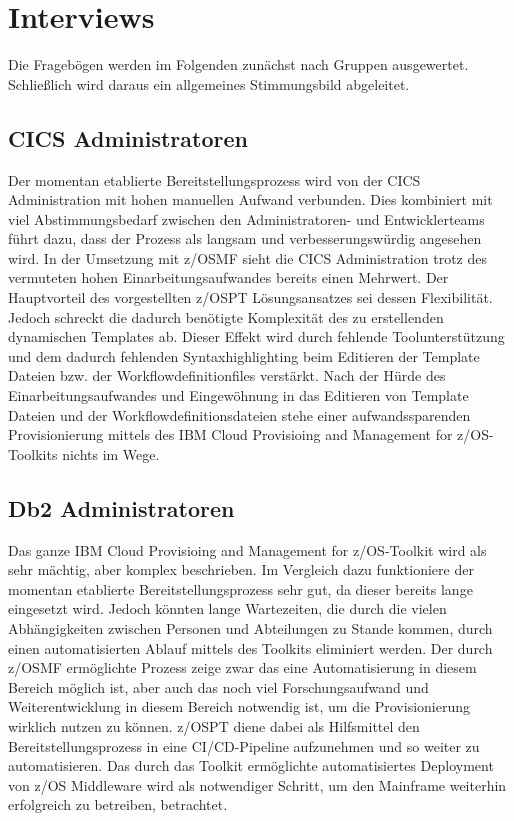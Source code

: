 \section{Interviews}
Die Fragebögen werden im Folgenden zunächst nach Gruppen ausgewertet.
Schließlich wird daraus ein allgemeines Stimmungsbild abgeleitet.

\subsection{CICS Administratoren}
Der momentan etablierte Bereitstellungsprozess wird von der CICS Administration mit hohen manuellen Aufwand verbunden.
Dies kombiniert mit viel Abstimmungsbedarf zwischen den Administratoren- und Entwicklerteams führt dazu, dass der Prozess als langsam und verbesserungswürdig angesehen wird.
In der Umsetzung mit z/OSMF sieht die CICS Administration trotz des vermuteten hohen Einarbeitungsaufwandes bereits einen Mehrwert.
Der Hauptvorteil des vorgestellten z/OSPT Lösungsansatzes sei dessen Flexibilität.
Jedoch schreckt die dadurch benötigte Komplexität des zu erstellenden dynamischen Templates ab.
Dieser Effekt wird durch fehlende Toolunterstützung und dem dadurch fehlenden Syntaxhighlighting beim Editieren der Template Dateien bzw. der Workflowdefinitionfiles verstärkt.
Nach der Hürde des Einarbeitungsaufwandes und Eingewöhnung in das Editieren von Template Dateien und der Workflowdefinitionsdateien stehe einer aufwandssparenden Provisionierung mittels des \glqq IBM Cloud Provisioing and Management for z/OS\grqq-Toolkits nichts im Wege.

\subsection{Db2 Administratoren}
Das ganze \glqq IBM Cloud Provisioing and Management for z/OS\grqq-Toolkit wird als sehr mächtig, aber komplex beschrieben.
Im Vergleich dazu funktioniere der momentan etablierte Bereitstellungsprozess sehr gut, da dieser bereits lange eingesetzt wird.
Jedoch könnten lange Wartezeiten, die durch die vielen Abhängigkeiten zwischen Personen und Abteilungen zu Stande kommen, durch einen automatisierten Ablauf mittels des Toolkits eliminiert werden.
Der durch z/OSMF ermöglichte Prozess zeige zwar das eine Automatisierung in diesem Bereich möglich ist, aber auch das noch viel Forschungsaufwand und Weiterentwicklung in diesem Bereich notwendig ist, um die Provisionierung wirklich nutzen zu können.
z/OSPT diene dabei als Hilfsmittel den Bereitstellungsprozess in eine CI/CD-Pipeline aufzunehmen und so weiter zu automatisieren.
Das durch das Toolkit ermöglichte automatisiertes Deployment von z/OS Middleware wird als notwendiger Schritt, um den Mainframe weiterhin erfolgreich zu betreiben, betrachtet.

